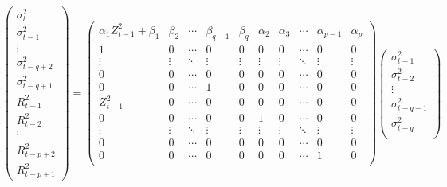 \documentclass[aoas,preprint]{imsart}
\numberwithin{equation}{section}
\theoremstyle{plain}
\begin{document}
\begin{tiny}
  \begin{equation*}
      \begin{pmatrix}
        \sigma_{t}^2 \\
        \sigma_{t-1}^2 \\
        \vdots \\
        \sigma_{t-q+2}^2 \\
        \sigma_{t-q+1}^2 \\
        R_{t-1}^2 \\
        R_{t-2}^2 \\
        \vdots \\
        R_{t-p+2}^2 \\
        R_{t-p+1}^2
      \end{pmatrix}
      =
      \begin{pmatrix}
        \alpha_1 Z_{t-1}^2 + \beta_1 & \beta_2 & \cdots &
        \beta_{q-1} & \beta_q & \alpha_2 & \alpha_3 &
        \cdots & \alpha_{p-1} & \alpha_p\\
        1 & 0 & \cdots & 
        0 & 0 & 0 & 0 & \cdots & 0 & 0 \\
        \vdots & \vdots & \ddots & 
        \vdots & \vdots & \vdots & \vdots &
        \ddots & \vdots & \vdots \\
        0 & 0 & \cdots &
        0 & 0 & 0 & 0 & \cdots & 0 & 0 \\
        0 & 0 & \cdots &
        1 & 0 & 0 & 0 & \cdots & 0 & 0 \\
        Z_{t-1}^2 & 0 & \cdots &
        0 & 0 & 0 & 0 & \cdots & 0 & 0 \\
        0 & 0 & \cdots &
        0 & 0 & 1 & 0 & \cdots & 0 & 0 \\
        \vdots & \vdots & \ddots &
        \vdots & \vdots & \vdots & \vdots &
        \ddots & \vdots & \vdots \\
        0 & 0 & \cdots &
        0 & 0 & 0 & 0 & \cdots & 0 & 0 \\    
        0 & 0 & \cdots &
        0 & 0 & 0 & 0 & \cdots & 1 & 0 \\    
      \end{pmatrix}
      \begin{pmatrix}
        \sigma_{t-1}^2 \\
        \sigma_{t-2}^2 \\
        \vdots \\
        \sigma_{t-q+1}^2 \\
        \sigma_{t-q}^2 \\

\end{pmatrix}
\end{equation*}
\end{tiny}
\end{document}
